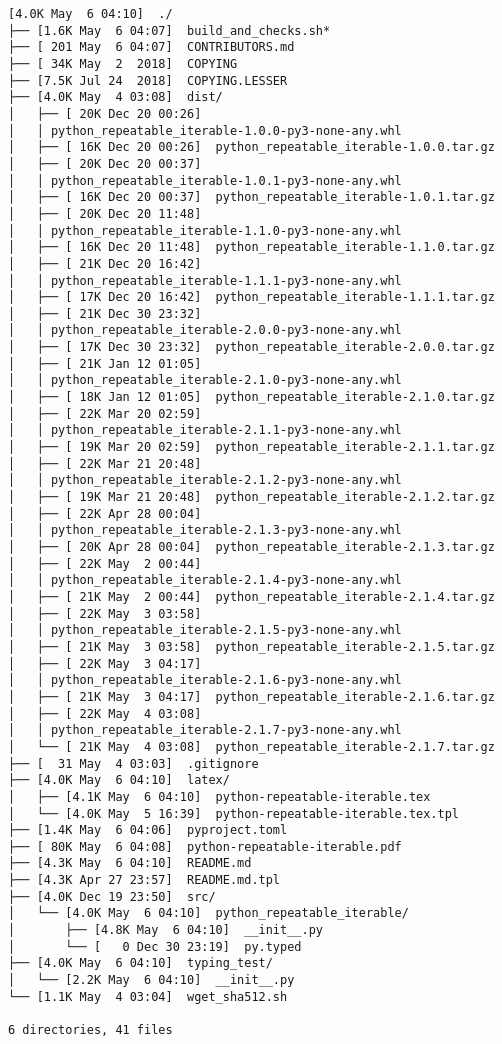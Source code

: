 \documentclass{article}
\begin{document}
\begin{verbatim}
[4.0K May  6 04:10]  ./
├── [1.6K May  6 04:07]  build_and_checks.sh*
├── [ 201 May  6 04:07]  CONTRIBUTORS.md
├── [ 34K May  2  2018]  COPYING
├── [7.5K Jul 24  2018]  COPYING.LESSER
├── [4.0K May  4 03:08]  dist/
│   ├── [ 20K Dec 20 00:26]
│   │ python_repeatable_iterable-1.0.0-py3-none-any.whl
│   ├── [ 16K Dec 20 00:26]  python_repeatable_iterable-1.0.0.tar.gz
│   ├── [ 20K Dec 20 00:37]
│   │ python_repeatable_iterable-1.0.1-py3-none-any.whl
│   ├── [ 16K Dec 20 00:37]  python_repeatable_iterable-1.0.1.tar.gz
│   ├── [ 20K Dec 20 11:48]
│   │ python_repeatable_iterable-1.1.0-py3-none-any.whl
│   ├── [ 16K Dec 20 11:48]  python_repeatable_iterable-1.1.0.tar.gz
│   ├── [ 21K Dec 20 16:42]
│   │ python_repeatable_iterable-1.1.1-py3-none-any.whl
│   ├── [ 17K Dec 20 16:42]  python_repeatable_iterable-1.1.1.tar.gz
│   ├── [ 21K Dec 30 23:32]
│   │ python_repeatable_iterable-2.0.0-py3-none-any.whl
│   ├── [ 17K Dec 30 23:32]  python_repeatable_iterable-2.0.0.tar.gz
│   ├── [ 21K Jan 12 01:05]
│   │ python_repeatable_iterable-2.1.0-py3-none-any.whl
│   ├── [ 18K Jan 12 01:05]  python_repeatable_iterable-2.1.0.tar.gz
│   ├── [ 22K Mar 20 02:59]
│   │ python_repeatable_iterable-2.1.1-py3-none-any.whl
│   ├── [ 19K Mar 20 02:59]  python_repeatable_iterable-2.1.1.tar.gz
│   ├── [ 22K Mar 21 20:48]
│   │ python_repeatable_iterable-2.1.2-py3-none-any.whl
│   ├── [ 19K Mar 21 20:48]  python_repeatable_iterable-2.1.2.tar.gz
│   ├── [ 22K Apr 28 00:04]
│   │ python_repeatable_iterable-2.1.3-py3-none-any.whl
│   ├── [ 20K Apr 28 00:04]  python_repeatable_iterable-2.1.3.tar.gz
│   ├── [ 22K May  2 00:44]
│   │ python_repeatable_iterable-2.1.4-py3-none-any.whl
│   ├── [ 21K May  2 00:44]  python_repeatable_iterable-2.1.4.tar.gz
│   ├── [ 22K May  3 03:58]
│   │ python_repeatable_iterable-2.1.5-py3-none-any.whl
│   ├── [ 21K May  3 03:58]  python_repeatable_iterable-2.1.5.tar.gz
│   ├── [ 22K May  3 04:17]
│   │ python_repeatable_iterable-2.1.6-py3-none-any.whl
│   ├── [ 21K May  3 04:17]  python_repeatable_iterable-2.1.6.tar.gz
│   ├── [ 22K May  4 03:08]
│   │ python_repeatable_iterable-2.1.7-py3-none-any.whl
│   └── [ 21K May  4 03:08]  python_repeatable_iterable-2.1.7.tar.gz
├── [  31 May  4 03:03]  .gitignore
├── [4.0K May  6 04:10]  latex/
│   ├── [4.1K May  6 04:10]  python-repeatable-iterable.tex
│   └── [4.0K May  5 16:39]  python-repeatable-iterable.tex.tpl
├── [1.4K May  6 04:06]  pyproject.toml
├── [ 80K May  6 04:08]  python-repeatable-iterable.pdf
├── [4.3K May  6 04:10]  README.md
├── [4.3K Apr 27 23:57]  README.md.tpl
├── [4.0K Dec 19 23:50]  src/
│   └── [4.0K May  6 04:10]  python_repeatable_iterable/
│       ├── [4.8K May  6 04:10]  __init__.py
│       └── [   0 Dec 30 23:19]  py.typed
├── [4.0K May  6 04:10]  typing_test/
│   └── [2.2K May  6 04:10]  __init__.py
└── [1.1K May  4 03:04]  wget_sha512.sh

6 directories, 41 files
\end{verbatim}
\end{document}
